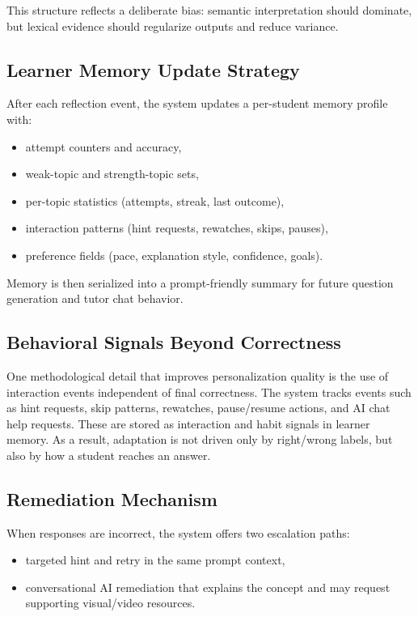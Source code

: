 \documentclass[conference]{IEEEtran}
\begin{document}
This structure reflects a deliberate bias: semantic interpretation should dominate, but lexical evidence should regularize outputs and reduce variance.

\subsection{Learner Memory Update Strategy}
After each reflection event, the system updates a per-student memory profile with:
\begin{itemize}
\item attempt counters and accuracy,
\item weak-topic and strength-topic sets,
\item per-topic statistics (attempts, streak, last outcome),
\item interaction patterns (hint requests, rewatches, skips, pauses),
\item preference fields (pace, explanation style, confidence, goals).
\end{itemize}

Memory is then serialized into a prompt-friendly summary for future question generation and tutor chat behavior.

\subsection{Behavioral Signals Beyond Correctness}
One methodological detail that improves personalization quality is the use of interaction events independent of final correctness. The system tracks events such as hint requests, skip patterns, rewatches, pause/resume actions, and AI chat help requests. These are stored as interaction and habit signals in learner memory. As a result, adaptation is not driven only by right/wrong labels, but also by how a student reaches an answer.

\subsection{Remediation Mechanism}
When responses are incorrect, the system offers two escalation paths:
\begin{itemize}
\item targeted hint and retry in the same prompt context,
\item conversational AI remediation that explains the concept and may request supporting visual/video resources.
\end{itemize}
\end{document}
